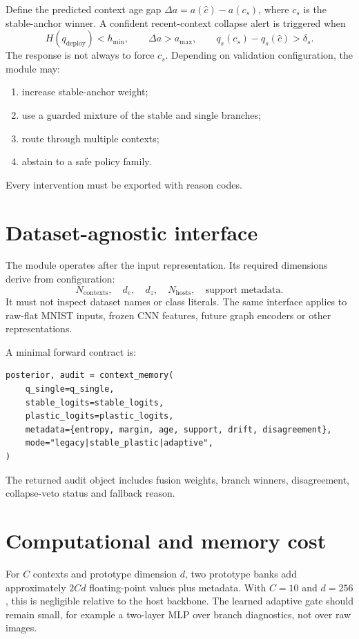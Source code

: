 \documentclass[10pt]{article}
\begin{document}
Define the predicted context age gap $\Delta a=a(\hat{c})-a(c_s)$, where $c_s$ is the stable-anchor winner. A confident recent-context collapse alert is triggered when
\begin{equation}
H(q_{\mathrm{deploy}})<h_{\min},\qquad
\Delta a>a_{\max},\qquad
q_s(c_s)-q_s(\hat{c})>\delta_s.
\end{equation}
The response is not always to force $c_s$. Depending on validation configuration, the module may:
\begin{enumerate}[leftmargin=*]
\item increase stable-anchor weight;
\item use a guarded mixture of the stable and single branches;
\item route through multiple contexts;
\item abstain to a safe policy family.
\end{enumerate}
Every intervention must be exported with reason codes.

\section{Dataset-agnostic interface}
The module operates after the input representation. Its required dimensions derive from configuration:
\begin{equation}
N_{\mathrm{contexts}},\quad d_e,\quad d_z,\quad N_{\mathrm{hosts}},\quad \text{support metadata}.
\end{equation}
It must not inspect dataset names or class literals. The same interface applies to raw-flat MNIST inputs, frozen CNN features, future graph encoders or other representations.

A minimal forward contract is:
\begin{verbatim}
posterior, audit = context_memory(
    q_single=q_single,
    stable_logits=stable_logits,
    plastic_logits=plastic_logits,
    metadata={entropy, margin, age, support, drift, disagreement},
    mode="legacy|stable_plastic|adaptive",
)
\end{verbatim}
The returned audit object includes fusion weights, branch winners, disagreement, collapse-veto status and fallback reason.

\section{Computational and memory cost}
For $C$ contexts and prototype dimension $d$, two prototype banks add approximately $2Cd$ floating-point values plus metadata. With $C=10$ and $d=256$, this is negligible relative to the host backbone. The learned adaptive gate should remain small, for example a two-layer MLP over branch diagnostics, not over raw images.
\end{document}
